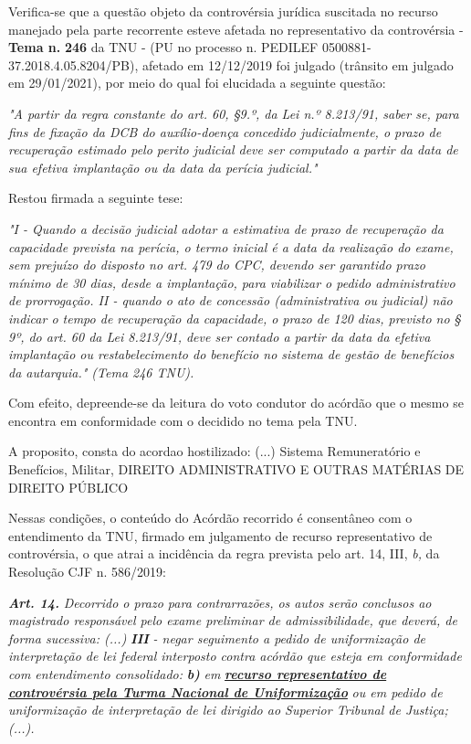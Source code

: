 \documentclass[12pt]{article}
\begin{document}
\justifying
\noindent Verifica-se que a questão objeto da controvérsia jurídica suscitada no recurso manejado pela parte recorrente esteve afetada no representativo da controvérsia - \textbf{Tema n. }\textbf{246} da TNU - (PU no processo n. PEDILEF 0500881-37.2018.4.05.8204/PB),  afetado em 12/12/2019 foi julgado (trânsito em julgado em 29/01/2021), por meio do qual foi elucidada a seguinte questão:

\noindent \textit{"A partir da regra constante do art. 60, §9.º, da Lei n.º 8.213/91, saber se, para fins de fixação da DCB do auxílio-doença concedido judicialmente, o prazo de recuperação estimado pelo perito judicial deve ser computado a partir da data de sua efetiva implantação ou da data da perícia judicial."}

\noindent Restou firmada a seguinte tese:

\noindent \textit{"I - Quando a decisão judicial adotar a estimativa de prazo de recuperação da capacidade prevista na perícia, o termo inicial é a data da realização do exame, sem prejuízo do disposto no art. 479 do CPC, devendo ser garantido prazo mínimo de 30 dias, desde a implantação, para viabilizar o pedido administrativo de prorrogação. II - quando o ato de concessão (administrativa ou judicial) não indicar o tempo de recuperação da capacidade, o prazo de 120 dias, previsto no § 9º, do art. 60 da Lei 8.213/91, deve ser contado a partir da data da efetiva implantação ou restabelecimento do benefício no sistema de gestão de benefícios da autarquia." (Tema 246 TNU).}

\noindent Com efeito, depreende-se da leitura do voto condutor do acórdão que o mesmo se encontra em conformidade com o decidido no  tema pela TNU.

\noindent A proposito, consta do acordao hostilizado: (...) Sistema Remuneratório e Benefícios, Militar, DIREITO ADMINISTRATIVO E OUTRAS MATÉRIAS DE DIREITO PÚBLICO

\noindent Nessas condições, o conteúdo do Acórdão recorrido é consentâneo com o entendimento da TNU, firmado em julgamento de recurso representativo de controvérsia, o que atrai a incidência da regra prevista pelo art. 14, III, \textit{b,} da Resolução CJF n. 586/2019:

\noindent \textit{\textbf{Art. 14.}}\textit{ Decorrido o prazo para contrarrazões, os autos serão conclusos ao magistrado responsável pelo exame preliminar de admissibilidade, que deverá, de forma sucessiva: (...) }\textit{\textbf{III }}\textit{- negar seguimento a pedido de uniformização de interpretação de lei federal interposto contra acórdão que esteja em conformidade com entendimento consolidado: }\textit{\textbf{b)}}\textit{ em }\uline{\textit{\textbf{recurso representativo de controvérsia pela Turma Nacional de Uniformização}}}\textit{ ou em pedido de uniformização de interpretação de lei dirigido ao Superior Tribunal de Justiça;(...).}
\end{document}

